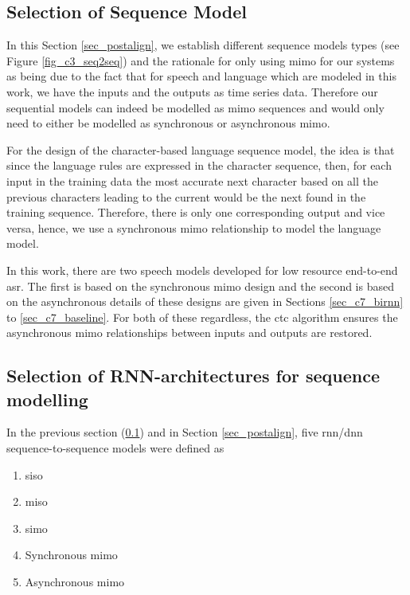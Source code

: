 \subsection{Selection of Sequence Model}\label{sec_c6_seqsel}
In this Section \ref{sec_postalign}, we establish different sequence models types (see Figure \ref{fig_c3_seq2seq}) and the rationale for only using \acrshort{mimo} for our systems as being due to the fact that for speech and language  which are modeled in this work, we have the inputs and the outputs as time series data. Therefore our sequential models can indeed be modelled as \acrshort{mimo} sequences and would only need to either be modelled as synchronous or asynchronous \acrshort{mimo}.

For the design of the character-based language sequence model, the idea is that since the language rules are expressed in the character sequence, then, for each input in the training data the most accurate next character based on all the previous characters leading to the current would be the next found in the training sequence.  Therefore, there is only one corresponding output and vice versa, hence, we use a synchronous \acrshort{mimo} relationship to model the language model.

In this work, there are two speech models developed for low resource end-to-end \acrshort{asr}.  The first is based on the synchronous \acrshort{mimo} design and the second is based on the asynchronous details of these designs are given in Sections \ref{sec_c7_birnn} to \ref{sec_c7_baseline}. For both of these regardless, the \acrshort{ctc} algorithm ensures the asynchronous \acrshort{mimo} relationships between inputs and outputs are restored.

\subsection{Selection of RNN-architectures for sequence modelling}
In the previous section (\ref{sec_c6_seqsel}) and in Section \ref{sec_postalign}, five \acrshort{rnn}/\acrshort{dnn} sequence-to-sequence models were defined as 
\begin{enumerate}
    \item \acrfull{siso}
    \item \acrfull{miso}
    \item \acrfull{simo}
    \item Synchronous \acrfull{mimo}
    \item Asynchronous \acrfull{mimo}
\end{enumerate}

